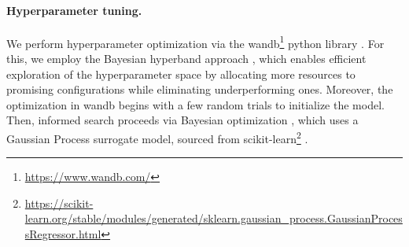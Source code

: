 \documentclass[a4paper,oneside,bibliography=totoc]{scrbook}
\begin{document}

\paragraph{Hyperparameter tuning.}
We perform hyperparameter optimization via the wandb\footnote{\href{https://www.wandb.com/}{\url{https://www.wandb.com/}}} python library \cite{biewald_experiment_2020}.
For this, we employ the Bayesian hyperband approach \cite{li_hyperband_2018, wang_combination_2018}, which enables efficient exploration of the hyperparameter space by allocating more resources to promising configurations while eliminating underperforming ones.
Moreover, the optimization in wandb begins with a few random trials to initialize the model. 
Then, informed search proceeds via Bayesian optimization \cite{dewancker_bayesian_2016}, which uses a Gaussian Process surrogate model, sourced from scikit-learn\footnote{\href{https://scikit-learn.org/stable/modules/generated/sklearn.gaussian_process.GaussianProcessRegressor.html}{\url{https://scikit-learn.org/stable/modules/generated/sklearn.gaussian_process.GaussianProcessRegressor.html}}} \cite{pedregosa_scikit-learn_2011}. %
\end{document}
